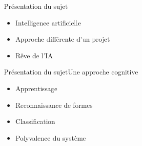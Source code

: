 \begin{frame}{Présentation du sujet}
	\begin{itemize}
		\item Intelligence artificielle
		\pause
		\item Approche différente d'un projet
		\pause
		\item Rêve de l'IA
	\end{itemize}
\end{frame}

\begin{frame}{Présentation du sujet}{Une approche cognitive}
	\begin{itemize}
		\item Apprentissage
		\item Reconnaissance de formes
		\item Classification
		\item Polyvalence du système
	\end{itemize}
\end{frame}
